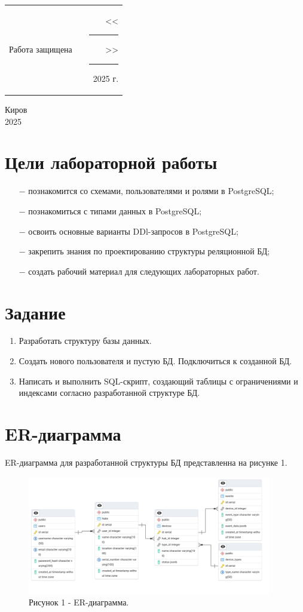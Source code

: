 \documentclass[oneside,a4paper,14pt]{extarticle}
\begin{document}
\noindent
\begin{tabular}{lp{58mm}r}
  Работа защищена &  & \hspace{13mm}<<\rule[-1mm]{5mm}{0.10mm}\/>>\rule[-1mm]{30mm}{0.10mm}\ 2025 г.
\end{tabular}
\vfill

\begin{center}
  Киров\\
  2025
\end{center}

\newpage\thispagestyle{plain}

\section*{Цели лабораторной работы}

\begin{itemize}
  \item[$-$] познакомится со схемами, пользователями и ролями в PostgreSQL;
  \item[$-$] познакомиться с типами данных в PostgreSQL;
  \item[$-$] освоить основные варианты DDl-запросов в PostgreSQL;
  \item[$-$] закрепить знания по проектированию структуры реляционной БД;
  \item[$-$] создать рабочий материал для следующих лабораторных работ.
\end{itemize}

\section*{Задание}
\begin{enumerate}
  \item Разработать структуру базы данных.
  \item Создать нового пользователя и пустую БД. Подключиться к созданной БД.
  \item Написать и выполнить SQL-скрипт, создающий таблицы с ограничениями и индексами согласно разработанной структуре БД.
\end{enumerate}

\clearpage
\section*{ER-диаграмма}
ER-диаграмма для разработанной структуры БД представленна на рисунке 1.
\begin{figure}[H]
  \centering
  \includegraphics[width=0.95\textwidth]{pics/erd_lab1.png}
  \caption*{Рисунок 1 - ER-диаграмма.}
\end{figure}
\end{document}
